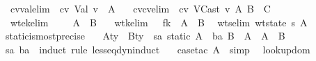 \begin{isabellebody}
\isamarkupfalse \isanewline
\ \ cv{\isacharunderscore}val{\isacharbrackleft}elim{\isacharbang}{\isacharbrackright}{\isacharcolon}\ {\isachardoublequoteopen}{\isasymSigma}\ {\isasymturnstile}cv\ Val\ v\ {\isacharcolon}\ A{\isachardoublequoteclose}\ \isanewline
\ \ cv{\isacharunderscore}cv{\isacharbrackleft}elim{\isacharbang}{\isacharbrackright}{\isacharcolon}\ {\isachardoublequoteopen}{\isasymSigma}\ {\isasymturnstile}cv\ VCast\ v\ A\ B\ {\isacharcolon}\ C{\isachardoublequoteclose}\ \isanewline
\isanewline
{}\isamarkupfalse \ \isanewline
\ \ wtek{\isacharbrackleft}elim{\isacharbang}{\isacharbrackright}{\isacharcolon}\ {\isachardoublequoteopen}{\isasymSigma}\ {\isasymturnstile}\ {\isacharbrackleft}{\isacharbrackright}\ {\isacharcolon}\ A\ {\isasymRightarrow}\ B{\isachardoublequoteclose}\ \isanewline
\ \ wtk{\isacharbrackleft}elim{\isacharbang}{\isacharbrackright}{\isacharcolon}\ {\isachardoublequoteopen}{\isasymSigma}\ {\isasymturnstile}\ f{\isacharhash}k\ {\isacharcolon}\ A\ {\isasymRightarrow}\ B{\isachardoublequoteclose}\ \isanewline
\isanewline
{}\isamarkupfalse \ wts{\isacharbrackleft}elim{\isacharbang}{\isacharbrackright}{\isacharcolon}\ {\isachardoublequoteopen}wt{\isacharunderscore}state\ s\ A{\isachardoublequoteclose}
\isamarkuptrue {}\isamarkupfalse \ static{\isacharunderscore}is{\isacharunderscore}most{\isacharunderscore}precise{\isacharcolon}\isanewline
\ \ \ A{\isacharcolon}{\isacharcolon}ty\ \ B{\isacharcolon}{\isacharcolon}ty\ \ sa{\isacharcolon}\ {\isachardoublequoteopen}static\ A{\isachardoublequoteclose}\ \ ba{\isacharcolon}\ {\isachardoublequoteopen}B\ {\isasymsqsubseteq}\ A{\isachardoublequoteclose}\ \ {\isachardoublequoteopen}A\ {\isacharequal}\ B{\isachardoublequoteclose}\isanewline
\isadelimproof
\ \ \endisadelimproof
\isatagproof
{}\isamarkupfalse \ sa\ ba\ \isamarkupfalse \ {\isacharparenleft}induct\ rule{\isacharcolon}\ lesseq{\isacharunderscore}dyn{\isachardot}induct{\isacharparenright}\isanewline
\ \ \isamarkupfalse \ {\isacharparenleft}case{\isacharunderscore}tac\ A{\isacharparenright}\ \isamarkupfalse \ simp{\isacharplus}\ \isamarkupfalse \endisatagproof
{\isafoldproof}\isadelimproof
\isanewline
\endisadelimproof
\isanewline
{}\isamarkupfalse \ lookup{\isacharunderscore}dom{\isacharcolon}\isanewline

\end{isabellebody}
